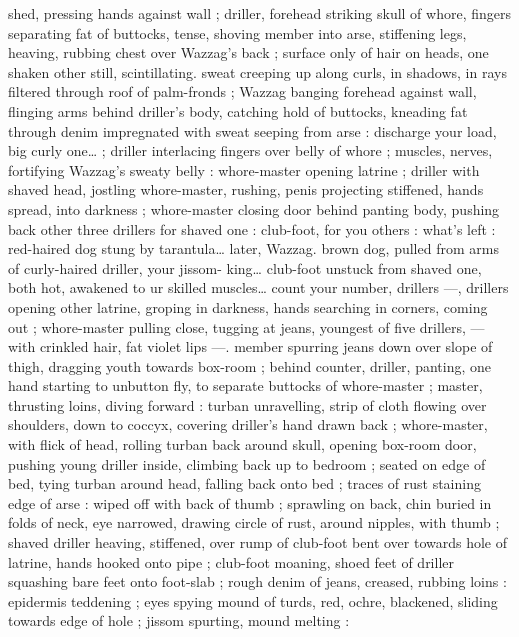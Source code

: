 shed, pressing hands against wall ; driller, forehead striking skull of 
whore, fingers separating fat of buttocks, tense, shoving member 
into arse, stiffening legs, heaving, rubbing chest over Wazzag's back 
; surface only of hair on heads, one shaken other still, scintillating. 
sweat creeping up along curls, in shadows, in rays filtered through 
roof of palm-fronds ; Wazzag banging forehead against wall, flinging 
arms behind driller's body, catching hold of buttocks, kneading fat 
through denim impregnated with sweat seeping from arse :{\td} {\gl}{\td} 
discharge your load, big curly one{\ldots}{\gr} ; driller interlacing fingers over 
belly of whore ; muscles, nerves, fortifying Wazzag's sweaty belly : 
whore-master opening latrine ; driller with shaved head, jostling 
whore-master, rushing, penis projecting stiffened, hands spread, into 
darkness ; whore-master closing door behind panting body, pushing 
back other three drillers{\td} {\gl} for shaved one : club-foot, for you others 
: what's left : red-haired dog stung by tarantula{\ldots} later, Wazzag. 
brown dog, pulled from arms of curly-haired driller, your jissom- 
king{\ldots} club-foot unstuck from shaved one, both hot, awakened to 
ur skilled muscles{\ldots} count your number, drillers{\td} {\gr} ---, drillers 
opening other latrine, groping in darkness, hands searching in 
corners, coming out ; whore-master pulling close, tugging at jeans, 
youngest of five drillers, --- with crinkled hair, fat violet lips ---. 
member spurring jeans down over slope of thigh, dragging youth 
towards box-room ; behind counter, driller, panting, one hand 
starting to unbutton fly, to separate buttocks of whore-master ; 
master, thrusting loins, diving forward : turban unravelling, strip of 
cloth flowing over shoulders, down to coccyx, covering driller's hand 
drawn back ; whore-master, with flick of head, rolling turban back 
around skull, opening box-room door, pushing young driller inside, 
climbing back up to bedroom ; seated on edge of bed, tying turban 
around head, falling back onto bed ; traces of rust staining edge of 
arse : wiped off with back of thumb ; sprawling on back, chin buried 
in folds of neck, eye narrowed, drawing circle of rust, around 
nipples, with thumb ; shaved driller heaving, stiffened, over rump of 
club-foot bent over towards hole of latrine, hands hooked onto pipe 
; club-foot moaning, shoed feet of driller squashing bare feet onto 
foot-slab ; rough denim of jeans, creased, rubbing loins : epidermis 
teddening ; eyes spying mound of turds, red, ochre, blackened, 
sliding towards edge of hole ; jissom spurting, mound melting : 
